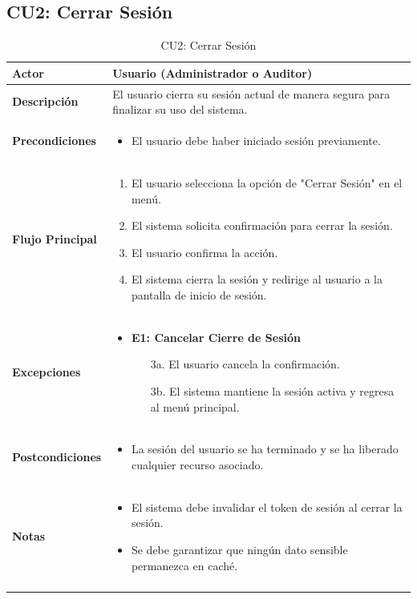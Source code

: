 \documentclass{article}
\begin{document}
\subsection{CU2: Cerrar Sesión}
\begin{longtable}{|l|p{10cm}|}
\hline
\textbf{Actor} & Usuario (Administrador o Auditor) \\ \hline
\textbf{Descripción} & El usuario cierra su sesión actual de manera segura para finalizar su uso del sistema. \\ \hline
\textbf{Precondiciones} & 
\begin{itemize}
    \item El usuario debe haber iniciado sesión previamente.
\end{itemize} \\ \hline
\textbf{Flujo Principal} & 
\begin{enumerate}
    \item El usuario selecciona la opción de "Cerrar Sesión" en el menú.
    \item El sistema solicita confirmación para cerrar la sesión.
    \item El usuario confirma la acción.
    \item El sistema cierra la sesión y redirige al usuario a la pantalla de inicio de sesión.
\end{enumerate} \\ \hline
\textbf{Excepciones} & 
\begin{itemize}
    \item \textbf{E1: Cancelar Cierre de Sesión}
    \begin{enumerate}
        \item[3a.] El usuario cancela la confirmación.
        \item[3b.] El sistema mantiene la sesión activa y regresa al menú principal.
    \end{enumerate}
\end{itemize} \\ \hline
\textbf{Postcondiciones} & 
\begin{itemize}
    \item La sesión del usuario se ha terminado y se ha liberado cualquier recurso asociado.
\end{itemize} \\ \hline
\textbf{Notas} & 
\begin{itemize}
    \item El sistema debe invalidar el token de sesión al cerrar la sesión.
    \item Se debe garantizar que ningún dato sensible permanezca en caché.
\end{itemize} \\ \hline
\caption{CU2: Cerrar Sesión}
\end{longtable}
\end{document}

